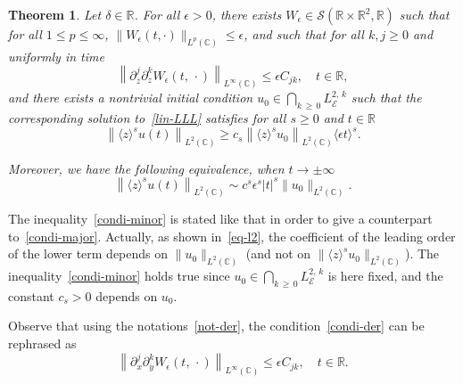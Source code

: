 \documentclass[10pt]{amsart}
\newtheorem{theo}{Theorem}[section]
\theoremstyle{definition}\newtheorem{defi}[theo]{Definition}\newtheorem{rema}[theo]{Remark}\newtheorem{exam}[theo]{Example}\newtheorem{exem}[theo]{Example}\newtheorem{nota}[theo]{Notation}
\newcommand{\C}{\mathbb{C}}
\newcommand{\R}{\mathbb{R}}
\newcommand{\E}{\mathcal{E}}
\newcommand{\crS}{\mathscr{S}}
\newcommand*\eps{\epsilon}
\newcommand{\ov}{\overline}
\newcommand{\<}{\langle}
\renewcommand{\>}{\rangle}
\begin{document}
\begin{theo} \label{thm2.3}
Let $\delta \in \R$. For all $\eps>0$, there exists $W_\eps \in \crS(\R \times \R^2, \R)$ such that for all $1 \leq p \leq \infty$, $\|W_\eps(t,\cdot)\|_{L^p(\C)}\leq \eps$, and such that for all $k,j\geq 0$ and uniformly in time
\begin{equation}\label{condi-der}
\left\|\partial^j_{\ov z } \partial^k_z W_\eps(t,\,\cdot)\right\|_{L^{\infty}(\C)}\leq \eps C_{jk}, \quad t\in \R,
\end{equation}
and there exists a nontrivial initial condition $ u_0 \in \bigcap_{k\,\geq\,0} L^{2,\,k}_\E$ such that the corresponding solution to~\eqref{lin-LLL} satisfies for all $s \geq 0$ and $t\in \R$
\begin{equation}\label{condi-minor}
\left\|\<z\>^s u(t)\right\|_{L^{2}(\C)} \geq c_s \left\|\<z\>^s u_0\right\|_{L^{2}(\C)}\<\eps t\>^{s}.
\end{equation}

Moreover, we have the following equivalence, when $ t\longrightarrow \pm
\infty$
\begin{equation}\label{eq-l2}
\left\|\<z\>^s u(t)\right\|_{L^{2}(\C)} \sim c^s \eps^s |t|^s \|u_0\|_{L^{2}(\C)}.
\end{equation}
\end{theo}

The inequality~\eqref{condi-minor} is stated like that in order to give a counterpart to~\eqref{condi-major}. Actually, as shown in~\eqref{eq-l2}, the coefficient of the leading order of the lower term depends on $\|u_0\|_{L^{2}(\C)}$ (and not on $ \|\<z\>^s u_0\|_{L^{2}(\C)}$). The inequality~\eqref{condi-minor} holds true since $u_0 \in \bigcap_{k\,\geq\, 0} L^{2,\,k}_\E$ is here fixed, and the constant $c_s>0$ depends on $u_0$.

Observe that using the notations~\eqref{not-der}, the condition~\eqref{condi-der} can be rephrased as
\[
\left\|\partial^j_{x} \partial^k_y W_\eps(t,\,\cdot)\right\|_{L^{\infty}(\C)}\leq
\eps C_{jk}, \quad t\in \R.
\]
\end{document}
